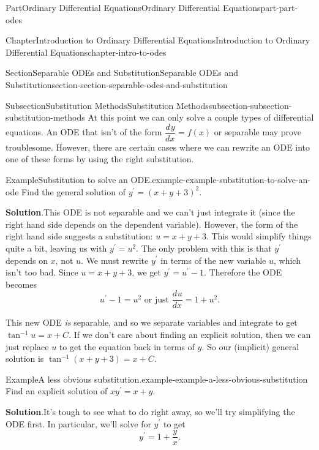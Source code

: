 \documentclass[twoside,10pt,]{book}
\newcommand{\blocktitlefont}{\relax}
\numberwithin{equation}{part}
\newcommand{\dv}[3][]{\dfrac{d^{#1} #2}{d #3^{#1}}}
\begin{document}
\begin{partptx}{Part}{Ordinary Differential Equations}{}{Ordinary Differential Equations}{}{}{part-part-odes}
\begin{chapterptx}{Chapter}{Introduction to Ordinary Differential Equations}{}{Introduction to Ordinary Differential Equations}{}{}{chapter-intro-to-odes}
\begin{sectionptx}{Section}{Separable ODEs and Substitution}{}{Separable ODEs and Substitution}{}{}{section-section-separable-odes-and-substitution}
\typeout{************************************************}
%
\begin{subsectionptx}{Subsection}{Substitution Methods}{}{Substitution Methods}{}{}{subsection-subsection-substitution-methods}
At this point we can only solve a couple types of differential equations. An ODE that isn't of the form \(\dv{y}{x} = f(x)\) or separable may prove troublesome. However, there are certain cases where we can rewrite an ODE into one of these forms by using the right substitution.%
\begin{example}{Example}{Substitution to solve an ODE.}{example-example-substitution-to-solve-an-ode}%
Find the general solution of \(y^\prime = (x+y+3)^{2}\).%
\par\smallskip%
\noindent\textbf{\blocktitlefont Solution}.\hypertarget{solution-example-substitution-to-solve-an-ode-c}{}\quad{}This ODE is not separable and we can't just integrate it (since the right hand side depends on the dependent variable). However, the form of the right hand side suggests a substitution: \(u = x+y+3\). This would simplify things quite a bit, leaving us with \(y^\prime=u^{2}\). The only problem with this is that \(y^\prime\) depends on \(x\), not \(u\). We must rewrite \(y^\prime\) in terms of the new variable \(u\), which isn't too bad. Since \(u = x+y+3\), we get \(y^\prime = u^\prime-1\). Therefore the ODE becomes%
\begin{equation*}
u^\prime-1 = u^{2}\text{ or just }\dv{u}{x} = 1+u^{2}.
\end{equation*}
%
\par
This new ODE \emph{is} separable, and so we separate variables and integrate to get \(\tan^{-1}u = x+C\). If we don't care about finding an explicit solution, then we can just replace \(u\) to get the equation back in terms of \(y\). So our (implicit) general solution is \(\tan^{-1}(x+y+3) = x+C\).%
\end{example}
\begin{example}{Example}{A less obvious substitution.}{example-example-a-less-obvious-substitution}%
Find an explicit solution of \(xy^\prime=x+y\).%
\par\smallskip%
\noindent\textbf{\blocktitlefont Solution}.\hypertarget{solution-example-a-less-obvious-substitution-c}{}\quad{}It's tough to see what to do right away, so we'll try simplifying the ODE first. In particular, we'll solve for \(y^\prime\) to get%
\begin{equation*}
y^\prime = 1+\frac{y}{x}.
\end{equation*}

\end{example}
\end{subsectionptx}
\end{sectionptx}
\end{chapterptx}
\end{partptx}
\end{document}
